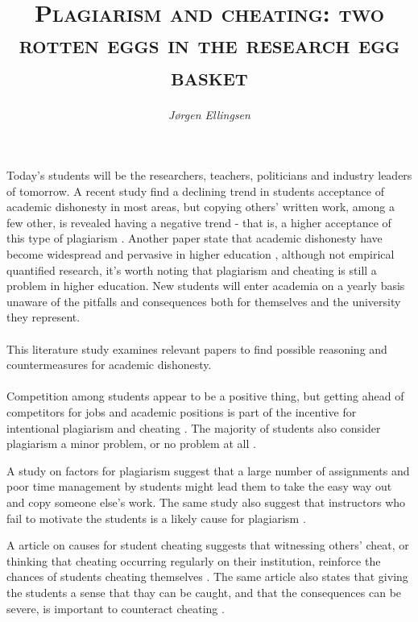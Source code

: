 \documentclass[12pt,a4paper]{article}
\author{\textit{Jørgen Ellingsen}}
\title{\textsc{Plagiarism and cheating: two rotten eggs in the research egg basket}}
\begin{document}
\maketitle
\date{}

Today's students will be the researchers, teachers, politicians and industry leaders of tomorrow. A recent study find a declining trend in students acceptance of academic dishonesty in most areas, but copying others' written work, among a few other, is revealed having a negative trend - that is, a higher acceptance of this type of plagiarism \cite{Molnar2015}. Another paper state that academic dishonesty have become widespread and pervasive in higher education \cite{Dalal2015}, although not empirical quantified research, it's worth noting that plagiarism and cheating is still a problem in higher education. New students will enter academia on a yearly basis unaware of the pitfalls and consequences both for themselves and the university they represent. 
\\ \\ %
This literature study examines relevant papers to find possible reasoning and countermeasures for academic dishonesty. 
\\ \\ %
Competition among students appear to be a positive thing, but getting ahead of competitors for jobs and academic positions is part of the incentive for intentional plagiarism and cheating \cite{Teixeira2010}. The  majority of students also consider plagiarism a minor problem, or no problem at all \cite{Teixeira2010}.

A study on factors for plagiarism suggest that a large number of assignments and poor time management by students might lead them to take the easy way out and copy someone else's work. The same study also suggest that instructors who fail to motivate the students is a likely cause for plagiarism \cite{Comas2010}.

A article on causes for student cheating suggests that witnessing others' cheat, or thinking that cheating occurring regularly on their institution, reinforce the chances of students cheating themselves \cite{Rettinger2009}. The same article also states that giving the students a sense that thay can be caught, and that the consequences can be severe, is important to counteract cheating \cite{Rettinger2009}.
\end{document}
